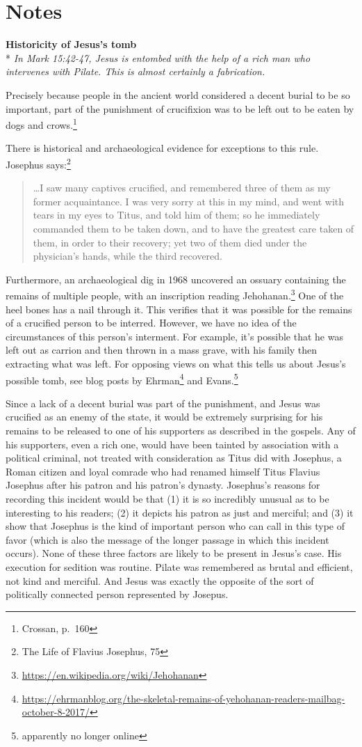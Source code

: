 \documentclass[10pt,twoside]{article} %
\newcommand{\quotesize}{\normalsize{}}
\newcommand{\maintextquotesize}{\renewcommand{\quotesize}{\large{}}}
\newcommand{\notequotesize}{\renewcommand{\quotesize}{\normalsize{}}}
\DeclareRobustCommand{\stixdangerousbend}{%
  {\usefont{U}{stixbbit}{m}{it}\symbol{"F6}}%
}
\newcommand{\dangerousbend}{\rotatebox[origin=c]{-10}{\stixdangerousbend}}
\newcommand{\link}[2]{\protect\jumplink{anchor-#1}{\textcolor{blue}{#2}}} %
\newcommand{\notetext}[2]{\textbf{\link{noteback-#1}{\dangerousbend\pageref{notebackref:#1}}\label{note:#1}\anchor{anchor-note-#1}\quad{}#2}\\*}
\newcommand{\notesummary}[1]{\emph{#1}\par}
\newenvironment{notesection}[1]{
  \setcounter{secnumdepth}{0}          %
  \section*{#1}
  \setcounter{secnumdepth}{2}          %
  \notequotesize
}%
{
  \maintextquotesize
}
\begin{document}
\begin{notesection}{Notes}
\notetext{tomb}{Historicity of Jesus's tomb}
\notesummary{In Mark 15:42-47, Jesus is entombed with the help of a rich man who intervenes with Pilate. This is almost
certainly a fabrication.}

Precisely because people in the ancient world considered a decent burial to be so important,
part of the punishment of crucifixion was to be left out to be eaten by dogs and crows.\footnote{Crossan, p.~160}

There is historical and archaeological evidence for exceptions to this rule. Josephus says:\footnote{The Life of Flavius Josephus, 75}

\begin{quote}
\ldots I saw many captives crucified, and
remembered three of them as my former acquaintance. I was very sorry at
this in my mind, and went with tears in my eyes to Titus, and told him
of them; so he immediately commanded them to be taken down, and to have
the greatest care taken of them, in order to their recovery; yet two of
them died under the physician's hands, while the third recovered.
\end{quote}


Furthermore, an archaeological dig in 1968 uncovered an ossuary containing the remains of multiple people,
with an inscription reading Jehohanan.\footnote{\url{https://en.wikipedia.org/wiki/Jehohanan}}
 One of the heel bones has a nail through it. This verifies that
it was possible for the remains of a crucified person to be interred. However, we have no idea of the
circumstances of this person's interment. For example, it's possible that he was left out as carrion and then
thrown in a mass grave, with his family then extracting what was left. For opposing views on what this tells us about Jesus's possible tomb,
see blog posts by Ehrman\footnote{\url{https://ehrmanblog.org/the-skeletal-remains-of-yehohanan-readers-mailbag-october-8-2017/}}
and Evans.\footnote{apparently no longer online}

Since a lack of a decent burial was part of the punishment, and Jesus was crucified as an enemy
of the state, it would be extremely surprising for his remains to be released to one of his supporters as described in the gospels.
Any of his supporters, even a rich one, would have been tainted by association with a political criminal,
not treated with consideration as Titus did with Josephus, a Roman citizen and loyal comrade who had renamed
himself Titus Flavius Josephus after his patron and his patron's dynasty. Josephus's reasons for recording
this incident would be that (1) it is so incredibly unusual as to be interesting to his readers;
(2) it depicts his patron as just and merciful; and
(3) it show that Josephus is the kind of important person who can call in this type of favor (which is also
the message of the longer passage in which this incident occurs).
None of these three factors are likely to be present in Jesus's case. His execution for sedition was
routine. Pilate was remembered as brutal and efficient, not kind and merciful. And Jesus was exactly
the opposite of the sort of politically connected person represented by Josepus.


\end{notesection}
\end{document}
